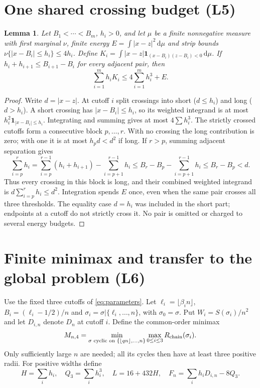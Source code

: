 \documentclass[11pt,a4paper]{article}
\newtheorem{lemma}[theorem]{Lemma}
\theoremstyle{remark}\newtheorem{remark}[theorem]{Remark}
\newcommand{\Rc}{R_{\rm chain}}
\newcommand{\ind}{\mathbf 1}
\newcommand{\dd}{\,\mathrm d}
\begin{document}
\section{One shared crossing budget (L5)}\label{sec:crossings}
\begin{lemma}\label{lem:crossing}
Let $B_1<\cdots<B_m$, $h_i>0$, and let $\mu$ be a finite nonnegative
measure with first marginal $\nu$, finite energy
$E=\int|x-z|^2\dd\mu$ and strip bounds
$\nu\{|x-B_i|\le h_i\}\le4h_i$. Define
$K_i=\int|x-z|\ind_{(x-B_i)(z-B_i)<0}\dd\mu$.
If $h_i+h_{i+1}\le B_{i+1}-B_i$ for every adjacent pair, then
\begin{equation}\label{eq:shared}
\sum_{i=1}^m h_iK_i\le4\sum_{i=1}^m h_i^3+E.
\end{equation}
\end{lemma}
\begin{proof}
Write $d=|x-z|$. At cutoff $i$ split crossings into short ($d\le h_i$)
and long ($d>h_i$). A short crossing has $|x-B_i|\le h_i$, so its
weighted integrand is at most $h_i^2\ind_{|x-B_i|\le h_i}$. Integrating
and summing gives at most $4\sum h_i^3$.
The strictly crossed cutoffs form a consecutive block $p,\ldots,r$.
With no crossing the long contribution is zero; with one it is at most
$h_pd<d^2$ if long. If $r>p$, summing adjacent separation gives
\[
\sum_{i=p}^r h_i
=\sum_{i=p}^{r-1}(h_i+h_{i+1})-\sum_{i=p+1}^{r-1}h_i
\le B_r-B_p-\sum_{i=p+1}^{r-1}h_i\le B_r-B_p<d.
\]
Thus every crossing in this block is long, and their combined weighted
integrand is $d\sum_{i=p}^rh_i\le d^2$. Integration spends $E$ once,
even when the same pair crosses all three thresholds. The equality case
$d=h_i$ was included in the short part; endpoints at a cutoff do not
strictly cross it. No pair is omitted or charged to several energy budgets.
\end{proof}

\section{Finite minimax and transfer to the global problem (L6)}\label{sec:minimax}
Use the fixed three cutoffs of \eqref{eq:parameters}. Let
$\ell_i=\lfloor\beta_i n\rfloor$, $B_i=(\ell_i-1/2)/n$ and
$\sigma_i=\sigma|\{\ell_i,\ldots,n\}$, with $\sigma_0=\sigma$.
Put $W_i=S(\sigma_i)/n^2$ and let $D_{i,n}$ denote $D_n$ at cutoff $i$.
Define the common-order minimax
\[
M_{n,4}=\min_{\sigma\text{ cyclic on }\{\lfloor qn\rfloor,\ldots,n\}}
\max_{0\le i\le3}\Rc(\sigma_i).
\]
Only sufficiently large $n$ are needed; all its cycles then have at least
three positive radii. For positive widths define
\[
H=\sum_i h_i,\quad Q_3=\sum_i h_i^3,\quad L=16+432H,
\quad F_n=\sum_i h_iD_{i,n}-8Q_3.
\]
\end{document}
